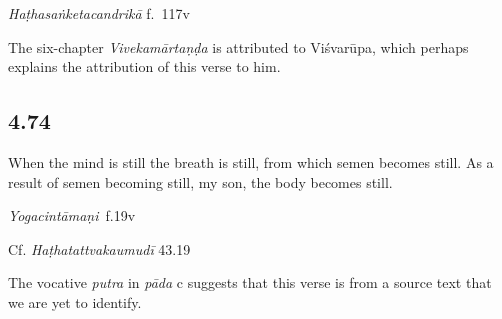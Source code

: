\begin{ekdosis}
\begin{testimonia}[hp04_073]
\emph{Haṭhasaṅketacandrikā} f.~117v
\begin{versinnote}
\tl{\var{mānasaṃ ca ] B220, mānaseva 2244}\\!}
\end{versinnote}
\end{testimonia}

\begin{philcomm}[hp04_073]
The six-chapter \emph{Vivekamārtaṇḍa} is attributed to Viśvarūpa, which perhaps explains the attribution of this verse to him.
\end{philcomm}

\subsection*{4.74}
\begin{translation}[hp04_074]
When the mind is still the breath is still, from which semen becomes still.  As a result of semen becoming still, my son, the body becomes still.
\end{translation}


\begin{testimonia}[hp04_074]
\emph{Yogacintāmaṇi}~f.19v
\begin{versinnote}
\end{versinnote}

Cf. \emph{Haṭhatattvakaumudī} 43.19
\begin{versinnote}
\end{versinnote}
\end{testimonia}

The vocative \emph{putra} in \emph{pāda} c suggests that this verse is from a source text that we are yet to identify.


\end{ekdosis}
